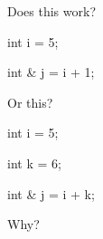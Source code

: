 Does this work?



\begin{consolethree}[escapeinside=||]

int i = 5;

int & j = i + 1;

\end{consolethree}



Or this?



\begin{consolethree}[escapeinside=||]

int i = 5;

int k = 6;

int & j = i + k;

\end{consolethree}



Why?

